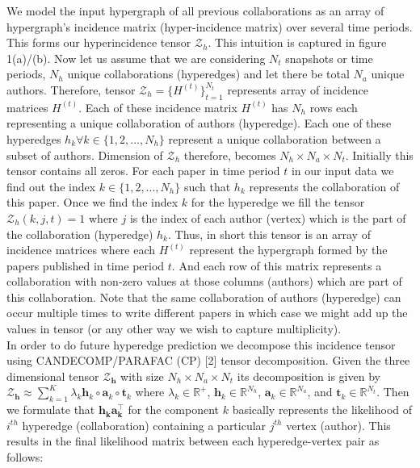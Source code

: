 \documentclass[a4paper,12pt]{article}
\begin{document}
We model the input hypergraph of all previous collaborations as an array of hypergraph's incidence matrix (hyper-incidence matrix) over several time periods. This forms our hyperincidence tensor $\mathscr{Z}_{h}$. This intuition is captured in figure 1(a)/(b). Now let us assume that we are considering \(N_{t}\) snapshots or time periods, $N_h$ unique collaborations (hyperedges) and let there be total $N_{a}$ unique authors. Therefore, tensor $\mathscr{Z}_{h}=\{H^{(t)}\}_{t=1}^{N_{t}}$ represents array of incidence matrices \(H^{(t)}\). Each of these incidence matrix $H^(t)$ has $N_h$ rows each representing a unique collaboration of authors (hyperedge). Each one of these hyperedges \(h_{k} \forall k \in \{1,2,...,N_{h}\}\) represent a unique collaboration between a subset of authors. Dimension of $\mathscr{Z}_{h}$ therefore, becomes \(N_{h}\times N_{a}\times N_{t}\). Initially this tensor contains all zeros. For each paper in time period \(t\) in our input data we find out the index \(k \in \{1,2,...,N_{h}\}\) such that \(h_{k}\) represents the collaboration of this paper. Once we find the index $k$ for the hyperedge we fill the tensor $\mathscr{Z}_{h}(k,j,t)= 1$ where \(j\) is the index of each author (vertex) which is the part of the collaboration (hyperedge) \(h_{k}\). Thus, in short this tensor is an array of incidence matrices where each \(H^{(t)}\) represent the hypergraph formed by the papers published in time period $t$. And each row of this matrix represents a collaboration with non-zero values at those columns (authors) which are part of this collaboration. Note that the same collaboration of authors (hyperedge) can occur multiple times to write different papers in which case we might add up the values in tensor (or any other way we wish to capture multiplicity). \\

In order to do future hyperedge prediction we decompose this incidence tensor using CANDECOMP/PARAFAC (CP) [2] tensor decomposition. Given the three dimensional tensor $\pmb{\mathscr{Z}_{h}}$ with size \(N_h \times N_a \times N_t\) its decomposition is given by $\pmb{\mathscr{Z}_{h}} \approx \sum\limits_{k=1}^K \lambda_{k} \mathbf{h}_{k} \circ \mathbf{a}_{k} \circ \mathbf{t}_{k}$ where \(\lambda_{k} \in \mathbb{R}^{+}\), \(\mathbf{h}_{k} \in \mathbb{R}^{N_h}\), \(\mathbf{a}_{k} \in \mathbb{R}^{N_a}\), and \(\mathbf{t}_{k} \in \mathbb{R}^{N_t}\). Then we formulate that $\mathbf{h_ka_k^{\top}}$ for the component $k$ basically represents the likelihood of $i^{th}$ hyperedge (collaboration) containing a particular $j^{th}$ vertex (author). This results in the final likelihood matrix between each hyperedge-vertex pair as follows: 
\end{document}
